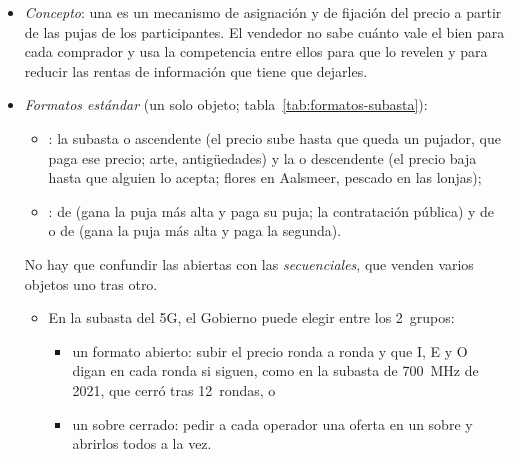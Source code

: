 \documentclass[11pt]{article}
\begin{document}
\begin{itemize}
\item \emph{Concepto}: una  es un mecanismo de asignación y de fijación del precio a partir de las pujas de los participantes. El vendedor no sabe cuánto vale el bien para cada comprador y usa la competencia entre ellos para que lo revelen y para reducir las rentas de información que tiene que dejarles\nocite{Klemperer2004Auctions}.
\item \emph{Formatos estándar} (un solo objeto; tabla~\ref{tab:formatos-subasta}):
  \begin{itemize}
  \item {}: la subasta  o ascendente (el precio sube hasta que queda un pujador, que paga ese precio; arte, antigüedades) y la  o descendente (el precio baja hasta que alguien lo acepta; flores en Aalsmeer, pescado en las lonjas);
  \item {}: de  (gana la puja más alta y paga su puja; la contratación pública) y de  o de  (gana la puja más alta y paga la segunda).
  \end{itemize}
  No hay que confundir las abiertas con las \emph{secuenciales}, que venden varios objetos uno tras otro.
  \begin{itemize}
  \item En la subasta del 5G, el Gobierno puede elegir entre los 2~grupos:
    \begin{itemize}
    \item un formato abierto: subir el precio ronda a ronda y que \textup{I}, E y O digan en cada ronda si siguen, como en la subasta de 700~MHz de 2021, que cerró tras 12~rondas\nocite{MINECO2021Subasta700}, o
    \item un sobre cerrado: pedir a cada operador una oferta en un sobre y abrirlos todos a la vez.
    \end{itemize}
  \end{itemize}
\end{itemize}
\end{document}
